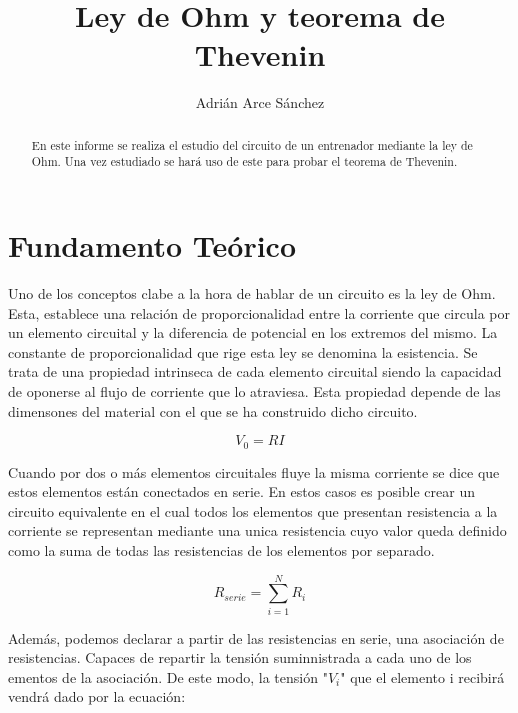 \documentclass[a4paper,11pt]{article}
\begin{document}
\begin{titlepage}
\title{Ley de Ohm y teorema de Thevenin}
\author{Adrián Arce Sánchez}
\maketitle
\end{titlepage}

\begin{abstract}

En este informe se realiza el estudio del circuito de un entrenador mediante la ley de Ohm. Una vez estudiado se hará uso de este para probar el teorema de Thevenin.
\end{abstract}

\section{Fundamento Teórico}
Uno de los conceptos clabe a la hora de hablar de un circuito es la ley de Ohm. Esta, establece una relación de proporcionalidad entre la corriente que circula por un elemento circuital y la diferencia de potencial en los extremos del mismo. La constante de proporcionalidad que rige esta ley se denomina la esistencia. Se trata de una propiedad intrinseca de cada elemento circuital siendo la capacidad de oponerse al flujo de corriente que lo atraviesa. Esta propiedad depende de las dimensones del material con el que se ha construido dicho circuito.

\begin{displaymath}
V_{0}=RI
\end{displaymath}

Cuando por dos o más elementos circuitales fluye la misma corriente se dice que estos elementos están conectados en serie. En estos casos es posible crear un circuito equivalente en el cual todos los elementos que presentan resistencia a la corriente se representan mediante una unica resistencia cuyo valor queda definido como la suma de todas las resistencias de los elementos por separado.

\begin{displaymath}
R_{serie}=\sum_{i=1}^N R_{i}
\end{displaymath}

Además, podemos declarar a partir de las resistencias en serie, una asociación de resistencias. Capaces de repartir la tensión suminnistrada a cada uno de los ementos de la asociación. De este modo, la tensión "$V_i$" que el elemento i recibirá vendrá dado por la ecuación:
\end{document}
